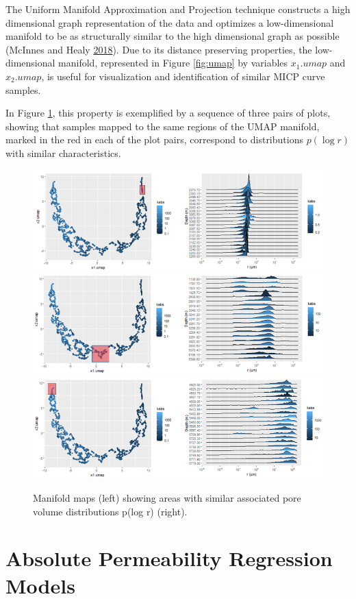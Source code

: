 \documentclass[english,msc,numbers]{coppe}
\begin{document}
  The Uniform Manifold Approximation and Projection technique constructs a high dimensional graph representation of the data and optimizes a low-dimensional manifold to be as structurally similar to the high dimensional graph as possible (McInnes and Healy \protect\hyperlink{ref-McInnes2018}{2018}). Due to its distance preserving properties, the low-dimensional manifold, represented in Figure \ref{fig:umap} by variables \(x_1.umap\) and \(x_2.umap\), is useful for visualization and identification of similar MICP curve samples.
  
  In Figure \ref{fig:umap-clustering}, this property is exemplified by a sequence of three pairs of plots, showing that samples mapped to the same regions of the UMAP manifold, marked in the red in each of the plot pairs, correspond to distributions \(p(\log{r})\) with similar characteristics.
  \begin{figure}[!h]
  
  {\centering \includegraphics[width=0.9\linewidth]{figure/3-8-umap-I} \includegraphics[width=0.9\linewidth]{figure/3-8-umap-II} \includegraphics[width=0.9\linewidth]{figure/3-8-umap-III} 
  
  }
  
  \caption{Manifold maps (left) showing areas with similar associated pore volume distributions p(log r) (right).}\label{fig:umap-clustering}
  \end{figure}
  \hypertarget{absolute-permeability-regression-models}{%
  \section{Absolute Permeability Regression Models}\label{absolute-permeability-regression-models}}
  
\end{document}
